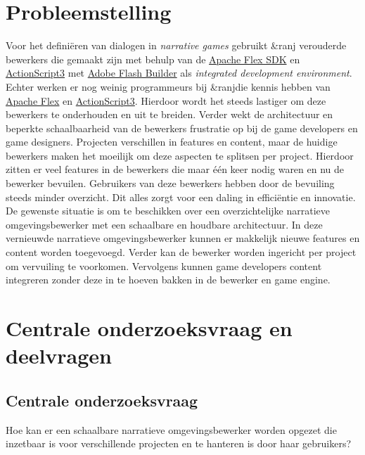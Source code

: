 \documentclass{report}
\newcommand{\organisation}{\&ranj}
\begin{document}
\section{Probleemstelling}
Voor het defini{\"e}ren van dialogen in \emph{narrative games} gebruikt \organisation{} verouderde bewerkers die gemaakt zijn met behulp van de \href{https://en.wikipedia.org/wiki/Apache_Flex}{Apache Flex SDK} en \href{http://www.adobe.com/devnet/actionscript/articles/actionscript3_overview.html}{ActionScript3} met \href{https://en.wikipedia.org/wiki/Adobe_Flash_Builder}{Adobe Flash Builder} als \emph{integrated development environment}. Echter werken er nog weinig programmeurs bij \organisation die kennis hebben van \href{https://en.wikipedia.org/wiki/Apache_Flex}{Apache Flex} en \href{http://www.adobe.com/devnet/actionscript/articles/actionscript3_overview.html}{ActionScript3}. Hierdoor wordt het steeds lastiger om deze bewerkers te onderhouden en uit te breiden. Verder wekt de architectuur en beperkte schaalbaarheid van de bewerkers frustratie op bij de game developers en game designers. Projecten verschillen in features en content, maar de huidige bewerkers maken het moeilijk om deze aspecten te splitsen per project. Hierdoor zitten er veel features in de bewerkers die maar {\'e}{\'e}n keer nodig waren en nu de bewerker bevuilen. Gebruikers van deze bewerkers hebben door de bevuiling steeds minder overzicht. Dit alles zorgt voor een daling in effici{\"e}ntie en innovatie.
De gewenste situatie is om te beschikken over een overzichtelijke narratieve omgevingsbewerker met een schaalbare en houdbare architectuur. In deze vernieuwde narratieve omgevingsbewerker kunnen er makkelijk nieuwe features en content worden toegevoegd. Verder kan de bewerker worden ingericht per project om vervuiling te voorkomen. Vervolgens kunnen game developers content integreren zonder deze in te hoeven bakken in de bewerker en game engine.

\newpage

\section{Centrale onderzoeksvraag en deelvragen}
\subsection{Centrale onderzoeksvraag}
Hoe kan er een schaalbare narratieve omgevingsbewerker worden opgezet die inzetbaar is voor verschillende projecten en te hanteren is door haar gebruikers?
\end{document}
